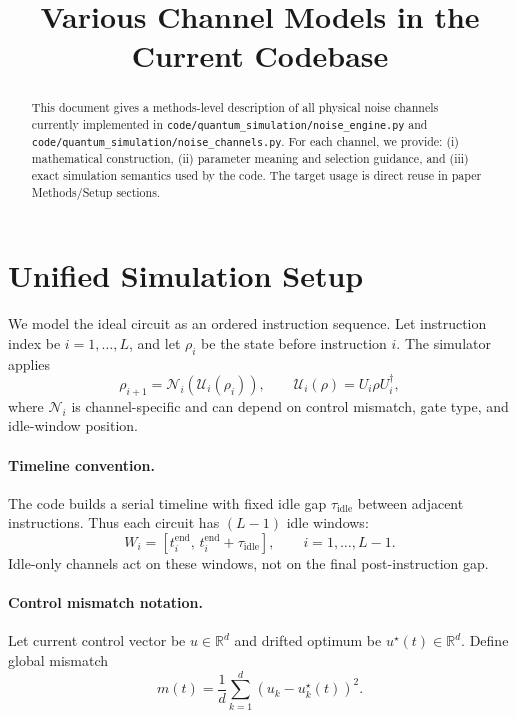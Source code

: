 \documentclass[11pt]{article}
\title{\bf Various Channel Models in the Current Codebase}
\author{}
\date{}
\begin{document}
\maketitle

\begin{abstract}
This document gives a methods-level description of all physical noise channels
currently implemented in
\texttt{code/quantum\_simulation/noise\_engine.py} and
\texttt{code/quantum\_simulation/noise\_channels.py}.
For each channel, we provide: (i) mathematical construction,
(ii) parameter meaning and selection guidance, and
(iii) exact simulation semantics used by the code.
The target usage is direct reuse in paper Methods/Setup sections.
\end{abstract}

\tableofcontents

\section{Unified Simulation Setup}

We model the ideal circuit as an ordered instruction sequence.
Let instruction index be $i=1,\dots,L$, and let
$\rho_i$ be the state before instruction $i$.
The simulator applies
\begin{equation}
\rho_{i+1} = \mathcal{N}_i\!\left(\mathcal{U}_i(\rho_i)\right),
\qquad
\mathcal{U}_i(\rho)=U_i\rho U_i^\dagger,
\label{eq:generic_update}
\end{equation}
where $\mathcal{N}_i$ is channel-specific and can depend on control mismatch,
gate type, and idle-window position.

\paragraph{Timeline convention.}
The code builds a serial timeline with fixed idle gap $\tau_{\mathrm{idle}}$
between adjacent instructions.
Thus each circuit has $(L-1)$ idle windows:
\begin{equation}
W_i = [t_i^{\mathrm{end}},\, t_i^{\mathrm{end}}+\tau_{\mathrm{idle}}],
\qquad i=1,\dots,L-1.
\end{equation}
Idle-only channels act on these windows, not on the final post-instruction gap.

\paragraph{Control mismatch notation.}
Let current control vector be $u\in\mathbb{R}^{d}$ and drifted optimum be
$u^\star(t)\in\mathbb{R}^{d}$.
Define global mismatch
\begin{equation}
m(t)=\frac{1}{d}\sum_{k=1}^{d}\left(u_k-u_k^\star(t)\right)^2.
\label{eq:global_mismatch}
\end{equation}
\end{document}
